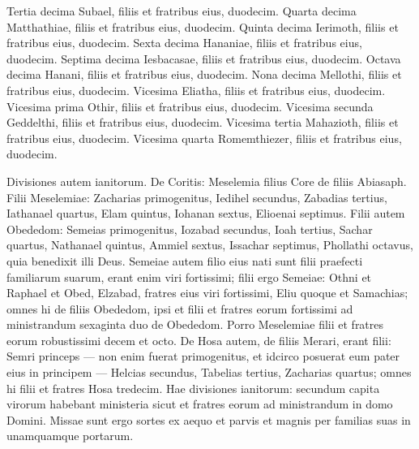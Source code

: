 \begin{biblechapter}
\begin{biblechapter}
\begin{biblechapter}
\begin{biblechapter}
\begin{biblechapter}
\begin{biblechapter}
\begin{biblechapter}
\begin{biblechapter}
\begin{biblechapter}
\begin{biblechapter}
\begin{biblechapter}
\begin{biblechapter}
\begin{biblechapter}
\begin{biblechapter}
\begin{biblechapter}
\begin{biblechapter}
\begin{biblechapter}
\begin{biblechapter}
\begin{biblechapter}
\begin{biblechapter}
\begin{biblechapter}
\begin{biblechapter}
\begin{biblechapter}
\begin{biblechapter}
\begin{biblechapter}
\verse Tertia decima Subael, filiis et fratribus eius, duodecim. 
\verse Quarta decima Matthathiae, filiis et fratribus eius, duodecim. 
\verse Quinta decima Ierimoth, filiis et fratribus eius, duodecim. 
\verse Sexta decima Hananiae, filiis et fratribus eius, duodecim. 
 \verse Septima decima Iesbacasae, filiis et fratribus eius, duodecim. 
\verse Octava decima Hanani, filiis et fratribus eius, duodecim. 
\verse Nona decima Mellothi, filiis et fratribus eius, duodecim. 
\verse Vicesima Eliatha, filiis et fratribus eius, duodecim. 
\verse Vicesima prima Othir, filiis et fratribus eius, duodecim. 
 \verse Vicesima secunda Geddelthi, filiis et fratribus eius, duodecim. 
\verse Vicesima tertia Mahazioth, filiis et fratribus eius, duodecim. 
\verse Vicesima quarta Romemthiezer, filiis et fratribus eius, duodecim.
 
\begin{biblechapter}
\verse Divisiones autem ianitorum.
 De Coritis: Meselemia filius Core de filiis Abiasaph. 
\verse Filii Meselemiae: Zacharias primogenitus, Iedihel secundus, Zabadias tertius, Iathanael quartus, 
 \verse Elam quintus, Iohanan sextus, Elioenai septimus. 
\verse Filii autem Obededom: Semeias primogenitus, Iozabad secundus, Ioah tertius, Sachar quartus, Nathanael quintus, 
\verse Ammiel sextus, Issachar septimus, Phollathi octavus, quia benedixit illi Deus. 
\verse Semeiae autem filio eius nati sunt filii praefecti familiarum suarum, erant enim viri fortissimi; 
\verse filii ergo Semeiae: Othni et Raphael et Obed, Elzabad, fratres eius viri fortissimi, Eliu quoque et Samachias; 
\verse omnes hi de filiis Obededom, ipsi et filii et fratres eorum fortissimi ad ministrandum sexaginta duo de Obededom. 
\verse Porro Meselemiae filii et fratres eorum robustissimi decem et octo.
 \verse De Hosa autem, de filiis Merari, erant filii: Semri princeps — non enim fuerat primogenitus, et idcirco posuerat eum pater eius in principem — 
\verse Helcias secundus, Tabelias tertius, Zacharias quartus; omnes hi filii et fratres Hosa tredecim.
 \verse Hae divisiones ianitorum: secundum capita virorum habebant ministeria sicut et fratres eorum ad ministrandum in domo Domini. 
\verse Missae sunt ergo sortes ex aequo et parvis et magnis per familias suas in unamquamque portarum. 

\end{biblechapter}
\end{biblechapter}
\end{biblechapter}
\end{biblechapter}
\end{biblechapter}
\end{biblechapter}
\end{biblechapter}
\end{biblechapter}
\end{biblechapter}
\end{biblechapter}
\end{biblechapter}
\end{biblechapter}
\end{biblechapter}
\end{biblechapter}
\end{biblechapter}
\end{biblechapter}
\end{biblechapter}
\end{biblechapter}
\end{biblechapter}
\end{biblechapter}
\end{biblechapter}
\end{biblechapter}
\end{biblechapter}
\end{biblechapter}
\end{biblechapter}
\end{biblechapter}
